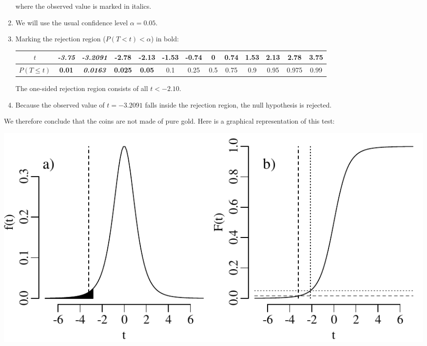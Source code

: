 \begin{enumerate}
  \noindent where the observed value is marked in italics.
  
\item We will use the usual confidence level $\alpha = 0.05$.

\item Marking the rejection region ($P(T<t)<\alpha$) in bold:
  
  \begin{center}
    \begin{tabular}{c|c@{\gap}c@{\gap}c@{\gap}c@{\gap}
        c@{\gap}c@{\gap}c@{\gap}c@{\gap}c@{\gap}c@{\gap}c@{\gap}c}
      $t$ & \textbf{\textit{-3.75}} & \textbf{\emph{-3.2091}} & \textbf{-2.78} &
      \textbf{-2.13} & -1.53 & -0.74 & 0 & 0.74 & 1.53 & 2.13 & 2.78 & 3.75 \\ \hline
      $P(T\leq{t})$ & \textbf{0.01} & \textbf{\textit{0.0163}} & \textbf{0.025} &
      \textbf{0.05} & 0.1 & 0.25 & 0.5 & 0.75 & 0.9 &
      0.95 & 0.975 & 0.99
    \end{tabular}
  \end{center}

  The one-sided rejection region consists of all $t<-2.10$.

\item Because the observed value of $t=-3.2091$ falls inside the
  rejection region, the null hypothesis is rejected.

\end{enumerate}

We therefore conclude that the coins are not made of pure gold. Here
is a graphical representation of this test:

\noindent\begin{minipage}[t][][b]{.6\textwidth}
  \includegraphics[width=\textwidth]{../figures/1samplettest.pdf}\\
\end{minipage}
\begin{minipage}[t][][t]{.4\textwidth}
  \label{fig:1samplettest}
\end{minipage}

